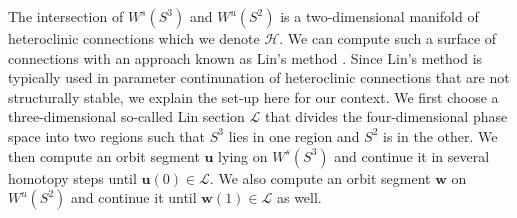 \documentclass{ws-ijbc}
\begin{document}
\begin{figure}[h]
\centering
{}
\caption{}
\end{figure}


The intersection of $W^s(S^3)$ and $W^u(S^2)$ is a two-dimensional manifold of heteroclinic connections which we denote $\mathscr{H}$.  We can compute such a surface of connections with an approach known as Lin's method \cite{Lin_original, Lin_POs, Lin_POs2}.  Since Lin's method is typically used in parameter continunation of heteroclinic connections that are not structurally stable, we explain the set-up here for our context.  We first choose a three-dimensional so-called Lin section $\mathscr{L}$ that divides the four-dimensional phase space into two regions such that $S^3$ lies in one region and $S^2$ is in the other.  We then compute an orbit segment $\mathbf{u}$ lying on $W^s(S^3)$ and continue it in several homotopy steps until $\mathbf{u}(0) \in \mathscr{L}$.  We also compute an orbit segment $\mathbf{w}$ on $W^u(S^2)$ and continue it until  $\mathbf{w}(1) \in \mathscr{L}$ as well.  
\end{document}
